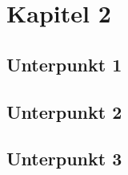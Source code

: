 \section{Kapitel 2}
\subsection{Unterpunkt 1}
\blindtext
 
\subsection{Unterpunkt 2}
\blindtext

\subsection{Unterpunkt 3}
\blindtext